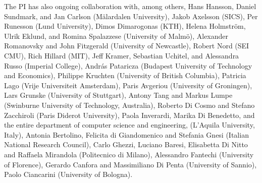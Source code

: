 \documentclass[12pt]{article}
\begin{document}
The PI has also ongoing collaboration with, among others, Hans Hansson, Daniel Sundmark, and Jan Carlson (M\"alardalen University), Jakob Axelsson (SICS), Per Runesson (Lund University), Dimos Dimarogonas (KTH), Helena Holmstr\"om, Ulrik Eklund, and Romina Spalazzese (University of Malm\"o), 
Alexander Romanovsky and John Fitzgerald (University of Newcastle), Robert Nord (SEI CMU), Rich Hillard (MIT), Jeff Kramer, Sebastian Uchitel, and Alessandra Russo (Imperial College), Andr\'as Pataricza (Budapest University of Technology and Economics), Philippe Kruchten (University of British Columbia), Patricia Lago (Vrije Universiteit Amsterdam), Paris Avgeriou (University of Groningen), Lars Grunske (University of Stuttgart), Antony Tang and Markus Lumpe (Swinburne University of Technology, Australia), Roberto Di Cosmo and Stefano Zacchiroli (Paris Diderot University), Paola Inverardi, Marika Di Benedetto, and the entire department of computer science and engineering, %
(L'Aquila University, Italy), Antonia Bertolino, Felicita di Giandomenico and Stefania Gnesi (Italian National Research Council), Carlo Ghezzi, Luciano Baresi, Elisabetta Di Nitto and Raffaela Mirandola (Politecnico di Milano), Alessandro Fantechi (University of Florence), Gerardo Canfora and Massimiliano Di Penta (University of Sannio), Paolo Ciancarini (University of Bologna).
\end{document}
